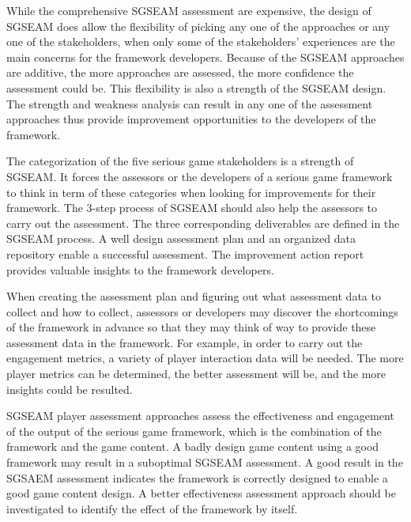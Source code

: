 While the comprehensive SGSEAM assessment are expensive, the design of SGSEAM does allow the flexibility of picking any one of the approaches or any one of the stakeholders, when only some of the stakeholders' experiences are the main concerns for the framework developers. Because of the SGSEAM approaches are additive, the more approaches are assessed, the more confidence the assessment could be. This flexibility is also a strength of the SGSEAM design. The strength and weakness analysis can result in any one of the assessment approaches thus provide improvement opportunities to the developers of the framework.

The categorization of the five serious game stakeholders is a strength of SGSEAM. It forces the assessors or the developers of a serious game framework to think in term of these categories when looking for improvements for their framework. The 3-step process of SGSEAM should also help the assessors to carry out the assessment. The three corresponding deliverables are defined in the SGSEAM process. A well design assessment plan and an organized data repository enable a successful assessment. The improvement action report provides valuable insights to the framework developers.

When creating the assessment plan and figuring out what assessment data to collect and how to collect,  assessors or developers may discover the shortcomings of the framework in advance so that they may think of way to provide these assessment data in the framework. For example, in order to carry out the engagement metrics, a variety of player interaction data will be needed. The more player metrics can be determined, the better assessment will be, and the more insights could be resulted.

SGSEAM player assessment approaches assess the effectiveness and engagement of the output of the serious game framework, which is the combination of the framework and the game content. A badly design game content using a good framework may result in a suboptimal SGSEAM assessment. A good result in the SGSAEM assessment indicates the framework is correctly designed to enable a good game content design. A better effectiveness assessment approach should be investigated to identify the effect of the framework by itself.

